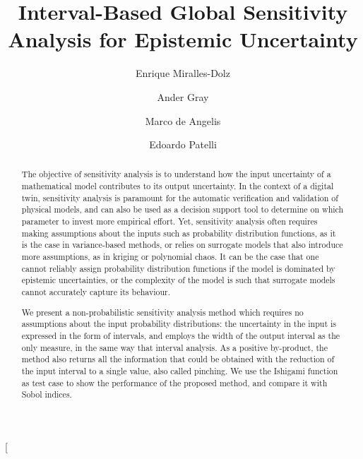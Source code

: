 \documentclass[twocolumn]{rps-esrel2022}
\begin{document}

\twocolumn[

\title{Interval-Based Global Sensitivity Analysis for Epistemic Uncertainty}

\author{Enrique Miralles-Dolz}

\address{Institute for Risk and Uncertainty, University of Liverpool, United Kingdom. }
\address{Culham Centre for Fusion Energy, United Kingdom Atomic Energy Authority, United Kingdom}

\author{Ander Gray}

\address{Institute for Risk and Uncertainty, University of Liverpool, United Kingdom. }
\address{Culham Centre for Fusion Energy, United Kingdom Atomic Energy Authority, United Kingdom}

\author{Marco de Angelis}

\address{Institute for Risk and Uncertainty, University of Liverpool, United Kingdom. }

\author{Edoardo Patelli}

\address{Centre for Intelligent Infrastructure, University of Strathclyde, United Kingdom. }

\begin{abstract}
     The objective of sensitivity analysis is to understand how the input uncertainty of a mathematical model contributes to its output uncertainty.
	In the context of a digital twin, sensitivity analysis is paramount for the automatic verification and validation of physical models, and can also
	be used as a decision support tool to determine on which parameter to invest more empirical effort. Yet, sensitivity analysis often requires making
	assumptions about the inputs such as probability distribution functions, as it is the case in variance-based methods, or relies on surrogate models
	that also introduce more assumptions, as in kriging or polynomial chaos. It can be the case that one cannot reliably assign probability distribution
	functions if the model is dominated by epistemic uncertainties, or the complexity of the model is such that surrogate models cannot accurately capture
	its behaviour.

	We present a non-probabilistic sensitivity analysis method which requires no assumptions about the input probability distributions: the uncertainty in
	the input is expressed in the form of intervals, and employs the width of the output interval as the only measure, in the same way that interval analysis.
	As a positive by-product, the method also returns all the information that could be obtained with the reduction of the input interval to a single value,
	also called pinching. We use the Ishigami function as test case to show the performance of the proposed method, and compare it with Sobol indices.
\end{abstract}
\end{document}

